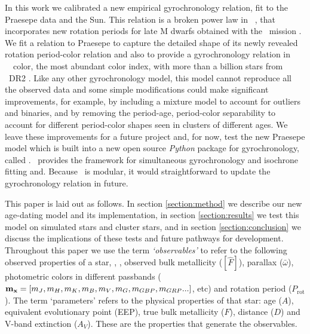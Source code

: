 In this work we calibrated a new empirical gyrochronology relation, fit to the
Praesepe data and the Sun.
This relation is a broken power law in \gaia\ \gcolor, that incorporates new
rotation periods for late M dwarfs obtained with the \ktwo\ mission
\citep{douglas2017, rebull2017}.
We fit a relation to Praesepe to capture the detailed shape of its newly
revealed rotation period-color relation and also to provide a gyrochronology
relation in \gaia\ \gcolor\ color, the most abundant color index, with more
than a billion stars from \gaia\ DR2 \citep{brown2018}.
Like any other gyrochronology model, this model cannot reproduce all the
observed data and some simple modifications could make significant
improvements, for example, by including a mixture model to account for
outliers and binaries, and by removing the period-age, period-color
separability to account for different period-color shapes seen in clusters of
different ages.
We leave these improvements for a future project and, for now, test the
new Praesepe model which is built into a new open source {\it Python} package
for gyrochronology, called \sd.
\sd\ provides the framework for simultaneous gyrochronology and isochrone
fitting and.
Because \sd\ is modular, it would straightforward to update the gyrochronology
relation in future.

This paper is laid out as follows.
In section \ref{section:method} we describe our new age-dating model and its
implementation, in section \ref{section:results} we test this model on
simulated stars and cluster stars, and in section \ref{section:conclusion} we
discuss the implications of these tests and future pathways for development.
Throughout this paper we use the term {\it `observables'} to refer to the
following observed properties of a star, \teff, \logg, observed bulk
metallicity ($[\hat{F}]$), parallax ($\bar{\omega}$), photometric
colors in different passbands (${\bf m_x} = [m_J, m_H, m_K, m_B, m_V, m_G,
m_{GBP}, m_{GRP}...]$, etc) and rotation period ($P_{\mathrm{rot}}$).
The term `parameters' refers to the physical properties of that star: age
($A$), equivalent evolutionary point (EEP), true bulk metallicity ($F$),
distance ($D$) and V-band extinction ($A_V$).
These are the properties that generate the observables.
